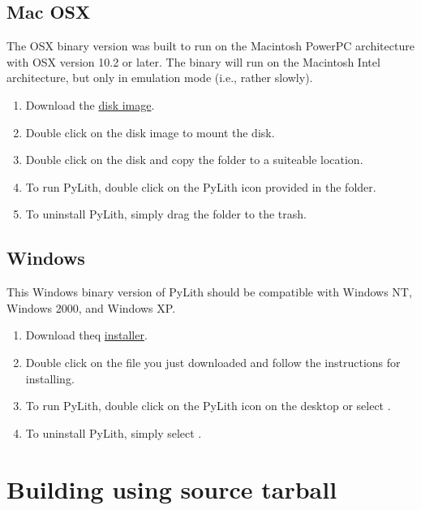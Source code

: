 \subsection{Mac OSX}

The OSX binary version was built to run on the Macintosh PowerPC
architecture with OSX version 10.2 or later. The binary will run on
the Macintosh Intel architecture, but only in emulation mode (i.e.,
rather slowly).

\begin{enumerate}
\item Download the \href{http://crust.geodynamics.org/~leif/shipping/}{disk image}.
\item Double click on the disk image to mount the disk.
\item Double click on the disk and copy the  folder
  to a suiteable location.
\item To run PyLith, double click on the PyLith icon provided in the  folder.
\item To uninstall PyLith, simply drag the  folder
  to the trash.
\end{enumerate}

\subsection{Windows}

This Windows binary version of PyLith should be compatible with
Windows NT, Windows 2000, and Windows XP.

\begin{enumerate}
\item Download theq
  \href{http://crust.geodynamics.org/~leif/shipping/}{installer}.
\item Double click on the  file you just
  downloaded and follow the instructions for installing.
\item To run PyLith, double click on the PyLith icon on the desktop or
  select
  \guiselect{}\guiselect{}\guiselect{}.
\item To uninstall PyLith, simply select
  \guiselect{}\guiselect{}\guiselect{}.
\end{enumerate}

\section{Building using source tarball}

